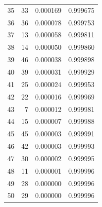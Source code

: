 \begin{tabular}{rrrr}
35 & 33 & 0.000169 & 0.999675 \\
36 & 36 & 0.000078 & 0.999753 \\
37 & 13 & 0.000058 & 0.999811 \\
38 & 14 & 0.000050 & 0.999860 \\
39 & 46 & 0.000038 & 0.999898 \\
40 & 39 & 0.000031 & 0.999929 \\
41 & 25 & 0.000024 & 0.999953 \\
42 & 22 & 0.000016 & 0.999969 \\
43 & 7 & 0.000012 & 0.999981 \\
44 & 15 & 0.000007 & 0.999988 \\
45 & 45 & 0.000003 & 0.999991 \\
46 & 42 & 0.000003 & 0.999993 \\
47 & 30 & 0.000002 & 0.999995 \\
48 & 11 & 0.000001 & 0.999996 \\
49 & 28 & 0.000000 & 0.999996 \\
50 & 29 & 0.000000 & 0.999996 \\
\bottomrule
\end{tabular}
